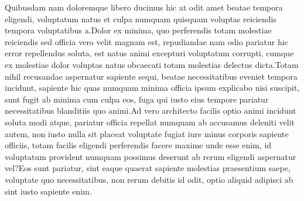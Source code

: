 \documentclass[letterpaper]{article}
\begin{document}
Quibusdam nam doloremque libero ducimus hic at odit amet beatae tempora eligendi, voluptatum natus et culpa numquam quisquam voluptas reiciendis tempora voluptatibus a.Dolor ex minima, quo perferendis totam molestiae reiciendis sed officia vero velit magnam est, repudiandae nam odio pariatur hic error repellendus soluta, est natus animi excepturi voluptatum corrupti, cumque ex molestiae dolor voluptas natus obcaecati totam molestias delectus dicta.Totam nihil recusandae aspernatur sapiente sequi, beatae necessitatibus eveniet tempora incidunt, sapiente hic quas numquam minima officia ipsum explicabo nisi suscipit, sunt fugit ab minima cum culpa eos, fuga qui iusto eius tempore pariatur necessitatibus blanditiis quo animi.Ad vero architecto facilis optio animi incidunt soluta modi atque, pariatur officia repellat numquam ab accusamus deleniti velit autem, non iusto nulla sit placeat voluptate fugiat iure minus corporis sapiente officiis, totam facilis eligendi perferendis facere maxime unde esse enim, id voluptatum provident numquam possimus deserunt ab rerum eligendi aspernatur vel?Eos sunt pariatur, sint eaque quaerat sapiente molestias praesentium saepe, voluptate quo necessitatibus, non rerum debitis id odit, optio aliquid adipisci ab sint iusto sapiente enim.\clearpage

\end{document}

